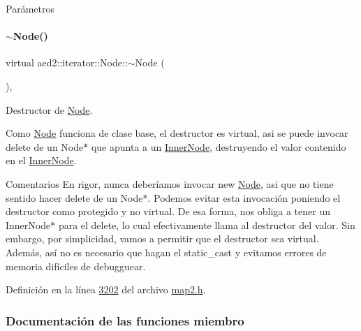 \begin{DoxyParams}{\-Parámetros}
\paragraph{\texorpdfstring{$\sim$\+Node()}{~Node()}}
{\footnotesize\ttfamily virtual aed2\+::iterator\+::\+Node\+::$\sim$\+Node (\begin{DoxyParamCaption}{ }\end{DoxyParamCaption})\hspace{0.3cm}{\ttfamily [inline]}, {\ttfamily [virtual]}}



Destructor de \hyperlink{structaed2_1_1iterator_1_1Node}{Node}. 

Como \hyperlink{structaed2_1_1iterator_1_1Node}{Node} funciona de clase base, el destructor es virtual, asi se puede invocar delete de un Node$\ast$ que apunta a un \hyperlink{structaed2_1_1iterator_1_1InnerNode}{Inner\+Node}, destruyendo el valor contenido en el \hyperlink{structaed2_1_1iterator_1_1InnerNode}{Inner\+Node}.

\begin{DoxyRemark}{Comentarios}
En rigor, nunca deberíamos invocar new \hyperlink{structaed2_1_1iterator_1_1Node}{Node}, asi que no tiene sentido hacer delete de un Node$\ast$. Podemos evitar esta invocación poniendo el destructor como protegido y no virtual. De esa forma, nos obliga a tener un Inner\+Node$\ast$ para el delete, lo cual efectivamente llama al destructor del valor. Sin embargo, por simplicidad, vamos a permitir que el destructor sea virtual. Además, así no es necesario que hagan el {\ttfamily static\+\_\+cast} y evitamos errores de memoria difíciles de debugguear. 
\end{DoxyRemark}


Definición en la línea \hyperlink{map2_8h_source_l03202}{3202} del archivo \hyperlink{map2_8h_source}{map2.\+h}.



\subsubsection{Documentación de las funciones miembro}
\mbox{\label{structaed2_1_1iterator_1_1Node_ac65ed5331c97b4a00f435c169283f92f_ac65ed5331c97b4a00f435c169283f92f}} 

\end{DoxyParams}
